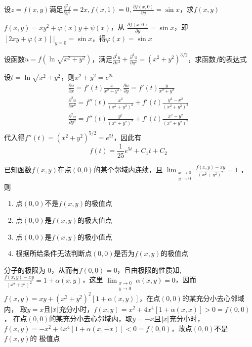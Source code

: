 \documentclass{article}
\begin{document}
\begin{examplle}[]
设\(z=f(x,y)\)满足\(\frac{\partial^2f}{\partial y^2}=2x,f(x,1)=0,\frac{\partial f(x,0)}{\partial y}=\sin
   x\)，求\(f(x,y)\)

\(f(x,y)=xy^2+\varphi(x)y+\psi(x)\)，从
\(\frac{\partial f(x,0)}{\partial y}=\sin x\)，即\([2xy+\varphi(x)]\Big\rvert_{y=0}=\sin
   x\)，得\(\varphi(x)=\sin x\)
\end{examplle}

\begin{examplle}[]
设函数\(u=f(\ln\sqrt{x^2+y^2})\)，满足\(\frac{\partial^2u}{\partial x^2}+\frac{\partial^2u}{\partial
   y^2}=(x^2+y^2)^{3/2}\)，求函数\(f\)的表达式

设\(t=\ln\sqrt{x^2+y^2}\)，则\(x^2+y^2=e^{2t}\)
\begin{gather*}
\frac{\partial u}{\partial x}=f'(t)\frac{x}{x^2+y^2},\frac{\partial u}{\partial y}=f'(t)\frac{y}{x^2+y^2}\\
\frac{\partial^2 u}{\partial x^2}=f''(t)\frac{x^2}{(x^2+y^2)^2}+f'(t)\frac{y^2-x^2}{(x^2+y^2)^2}\\
\frac{\partial^2 u}{\partial y^2}=f''(t)\frac{y^2}{(x^2+y^2)^2}+f'(t)\frac{x^2-y^2}{(x^2+y^2)^2}\\
\end{gather*}
代入得\(f''(t)=(x^2+y^2)^{5/2}=e^{5t}\)，因此有
\begin{equation*}
f(t)=\frac{1}{25}e^{5t}+C_1t+C_2
\end{equation*}
\end{examplle}

\begin{examplle}[]
已知函数\(f(x,y)\)在点\((0,0)\)的某个邻域内连续，且
\(\displaystyle\lim_{\substack{x\to0\\y\to0}}\frac{f(x,y)-xy}{(x^2+y^2)^2}=1\)
，则
\begin{enumerate}
\item 点\((0,0)\)不是\(f(x,y)\)的极值点
\item 点\((0,0)\)是\(f(x,y)\)的极大值点
\item 点\((0,0)\)是\(f(x,y)\)的极小值点
\item 根据所给条件无法判断点\((0,0)\)是否为\(f(x,y)\)的极值点
\end{enumerate}


分子的极限为 0，从而有\(f(0,0)=0\)，且由极限的性质知,
\(\frac{f(x,y)-xy}{(x^2+y^2)^2}=1+\alpha(x,y)\)，这里
\(\displaystyle\lim_{\substack{x\to0\\y\to0}}\alpha(x,y)=0\)，因而
\(f(x,y)=xy+(x^2+y^2)^2[1+\alpha(x,y)]\)，在点\((0,0)\)的某充分小去心邻域内，
取\(y=x\)且\(\abs{x}\)充分小时，\(f(x,y)=x^2+4x^4[1+\alpha(x,x)]>0=f(0,0)\)，
在点\((0,0)\)的某充分小去心邻域内，取\(y=-x\)且\(\abs{x}\)充分小时，
\(f(x,y)=-x^2+4x^4[1+\alpha(x,-x)]<0=f(0,0)\)，故点\((0,0)\)不是\(f(x,y)\)的
极值点
\end{examplle}
\end{document}
